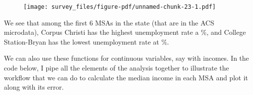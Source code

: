\documentclass[
  letterpaper,
  DIV=11,
  numbers=noendperiod]{scrreprt}
\begin{document}
\begin{figure}[H]

{\centering \texttt{[image: survey\_files/figure-pdf/unnamed-chunk-23-1.pdf]}

}

\end{figure}

We see that among the first 6 MSAs in the state (that are in the ACS
microdata), Corpus Christi has the highest unemployment rate a \%, and
College Station-Bryan has the lowest unemployment rate at \%.

We can also use these functions for continuous variables, say with
incomes. In the code below, I pipe all the elements of the analysis
together to illustrate the workflow that we can do to calculate the
median income in each MSA and plot it along with its error.
\end{document}
